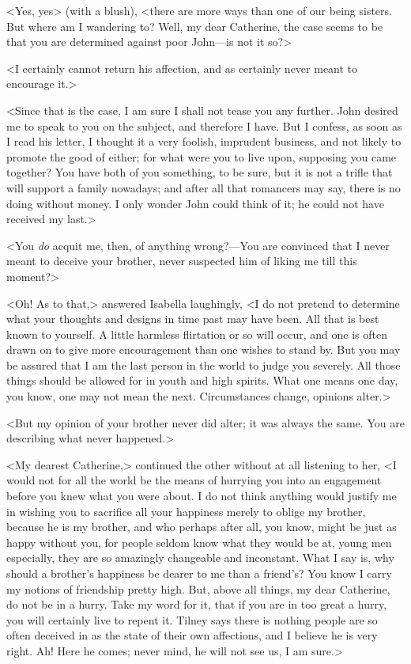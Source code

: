  <Yes, yes> (with a blush), <there are more ways than one of our being sisters. But where am I wandering to? Well, my dear Catherine, the case seems to be that you are determined against poor John—is not it so?> 

 <I certainly cannot return his affection, and as certainly never meant to encourage it.> 

 <Since that is the case, I am sure I shall not tease you any further. John desired me to speak to you on the subject, and therefore I have. But I confess, as soon as I read his letter, I thought it a very foolish, imprudent business, and not likely to promote the good of either; for what were you to live upon, supposing you came together? You have both of you something, to be sure, but it is not a trifle that will support a family nowadays; and after all that romancers may say, there is no doing without money. I only wonder John could think of it; he could not have received my last.> 

 <You \textit{do} acquit me, then, of anything wrong?—You are convinced that I never meant to deceive your brother, never suspected him of liking me till this moment?> 

 <Oh! As to that,> answered Isabella laughingly, <I do not pretend to determine what your thoughts and designs in time past may have been. All that is best known to yourself. A little harmless flirtation or so will occur, and one is often drawn on to give more encouragement than one wishes to stand by. But you may be assured that I am the last person in the world to judge you severely. All those things should be allowed for in youth and high spirits. What one means one day, you know, one may not mean the next. Circumstances change, opinions alter.> 

 <But my opinion of your brother never did alter; it was always the same. You are describing what never happened.> 

 <My dearest Catherine,> continued the other without at all listening to her, <I would not for all the world be the means of hurrying you into an engagement before you knew what you were about. I do not think anything would justify me in wishing you to sacrifice all your happiness merely to oblige my brother, because he is my brother, and who perhaps after all, you know, might be just as happy without you, for people seldom know what they would be at, young men especially, they are so amazingly changeable and inconstant. What I say is, why should a brother's happiness be dearer to me than a friend's? You know I carry my notions of friendship pretty high. But, above all things, my dear Catherine, do not be in a hurry. Take my word for it, that if you are in too great a hurry, you will certainly live to repent it. Tilney says there is nothing people are so often deceived in as the state of their own affections, and I believe he is very right. Ah! Here he comes; never mind, he will not see us, I am sure.> 

